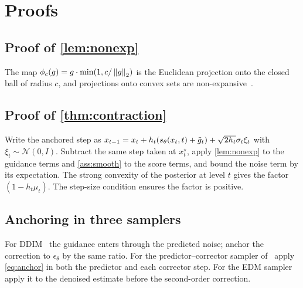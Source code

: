 \section{Proofs}
\label{app:proofs}
\subsection{Proof of \cref{lem:nonexp}}
\label{app:proof-lemma}
The map $\phi_c(g) = g \cdot \min(1, c / \left\lVert g \right\rVert_2)$ is the Euclidean projection onto the closed ball of radius $c$, and projections onto convex sets are non-expansive~\cite{bauschke2011convex}.

\subsection{Proof of \cref{thm:contraction}}
\label{app:proof-theorem}
Write the anchored step as $x_{t-1} = x_t + h_t (s_\theta(x_t, t) + \tilde{g}_t) + \sqrt{2 h_t} \sigma_t \xi_t$ with $\xi_t \sim \mathcal{N}(0, I)$. Subtract the same step taken at $x^\star_t$, apply \cref{lem:nonexp} to the guidance terms and \cref{ass:smooth} to the score terms, and bound the noise term by its expectation. The strong convexity of the posterior at level $t$ gives the factor $(1 - h_t \mu_t)$. The step-size condition ensures the factor is positive.

\subsection{Anchoring in three samplers}
\label{app:samplers}
For DDIM~\cite{song2021ddim} the guidance enters through the predicted noise; anchor the correction to $\epsilon_\theta$ by the same ratio. For the predictor--corrector sampler of~\cite{song2021sde} apply \cref{eq:anchor} in both the predictor and each corrector step. For the EDM sampler~\cite{karras2022edm} apply it to the denoised estimate before the second-order correction.

